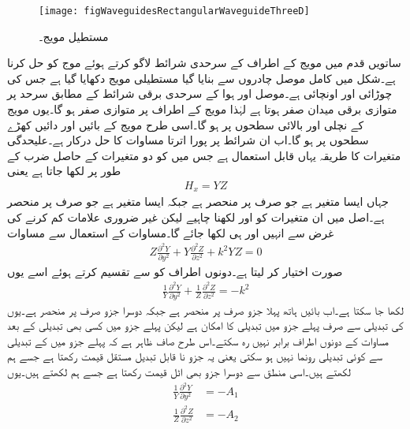 \begin{figure}
\centering
\texttt{[image: figWaveguidesRectangularWaveguideThreeD]}
\caption{مستطیل مویج۔}
\label{شکل_مویج_مستطیل_مویج_اطراف}
\end{figure}
ساتویں قدم میں مویج کے اطراف کے سرحدی شرائط لاگو کرتے ہوئے موج کو حل کرنا ہے۔شکل  میں کامل موصل چادروں سے بنایا گیا مستطیلی مویج دکھایا گیا ہے جس کی چوڑائی  اور اونچائی  ہے۔موصل اور ہوا کے سرحدی برقی شرائط کے مطابق سرحد پر متوازی برقی میدان صفر ہوتا ہے لہٰذا مویج کے اطراف پر متوازی  صفر ہو گا۔یوں مویج کے نچلی اور  بالائی سطحوں پر  ہو گا۔اسی طرح مویج کے بائیں اور دائیں کھڑے سطحوں پر  ہو گا۔اب ان شرائط پر پورا اترتا مساوات  کا حل درکار ہے۔علیحدگی متغیرات کا طریقہ یہاں قابل استعمال ہے جس میں  کو دو متغیرات کے حاصل ضرب کے طور پر لکھا جاتا ہے یعنی
\begin{align}\label{مساوات_مویج_علحدگی_متغیرات}
H_x=Y Z
\end{align}
جہاں  ایسا متغیر ہے جو صرف  پر منحصر ہے جبکہ  ایسا متغیر ہے جو صرف  پر منحصر ہے۔اصل میں ان متغیرات کو  اور  لکھنا چاہیے لیکن غیر ضروری علامات کم کرنے کی غرض سے انہیں  اور  ہی لکھا جائے گا۔مساوات   کے استعمال سے مساوات 
\begin{align}
Z \frac{\partial^2 Y}{\partial y^2}+Y \frac{\partial^2 Z}{\partial z^2}+k^2 Y Z =0
\end{align}
صورت اختیار کر لیتا ہے۔دونوں اطراف کو  سے تقسیم کرتے ہوئے اسے یوں
\begin{align}\label{مساوات_میوج_س}
\frac{1}{Y}\frac{\partial^2 Y}{\partial y^2}+\frac{1}{Z} \frac{\partial^2 Z}{\partial z^2}=-k^2
\end{align}
لکھا جا سکتا ہے۔اب بائیں ہاتھ پہلا جزو صرف  پر منحصر ہے  جبکہ دوسرا جزو صرف  پر منحصر ہے۔یوں  کی تبدیلی سے صرف پہلے جزو میں تبدیلی کا امکان ہے لیکن پہلے جزو میں کسی بھی تبدیلی کے بعد مساوات کے دونوں اطراف برابر نہیں رہ سکتے۔اس طرح صاف ظاہر ہے کہ پہلے جزو میں  کے تبدیلی سے کوئی تبدیلی رونما نہیں ہو سکتی یعنی یہ جزو نا قابل تبدیل مستقل قیمت رکھتا ہے جسے ہم  لکھتے ہیں۔اسی منطق سے دوسرا جزو بھی اٹل قیمت رکھتا ہے جسے ہم  لکھتے ہیں۔یوں
\begin{align}
\frac{1}{Y}\frac{\partial^2 Y}{\partial y^2}&=-A_1 \label{مساوات_میوج_ش}\\
\frac{1}{Z} \frac{\partial^2 Z}{\partial z^2}&=-A_2 \label{مساوات_میوج_ص}
\end{align} 
